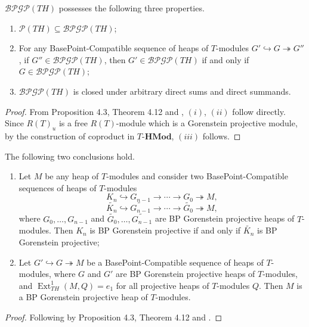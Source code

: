 \documentclass[11pt, twoside]{article}
\begin{document}
\begin{proposition}
$\mathcal{BPGP}(TH)$ possesses the following three properties.
\begin{enumerate}
    \item[(i)] $\mathcal{P}(TH) \subseteq \mathcal{BPGP}(TH)$;
    \item[(ii)] For any BasePoint-Compatible sequence of heaps of $T$-modules $G'\hookrightarrow G \twoheadrightarrow G''$, if $G''\in \mathcal{BPGP}(TH)$, then $G'\in \mathcal{BPGP}(TH)$ if and only if $G\in \mathcal{BPGP}(TH)$;
    \item[(iii)] $\mathcal{BPGP}(TH)$ is closed under arbitrary direct sums and direct summands.
\end{enumerate}
\end{proposition}
\begin{proof}
From Proposition 4.3, Theorem 4.12 and \cite[Theorem 2.5]{rb}, $(i)$, $(ii)$ follow directly. Since $R(T)_u$ is a free $R(T)$-module which is a Gorenstein projective module, by the construction of coproduct in $T\textbf{-HMod}$, $(iii)$ follows.
\end{proof}



\begin{proposition}
The following two conclusions hold.
\begin{enumerate}
    \item[(i)] Let $M$ be any heap of $T$-modules and consider two BasePoint-Compatible sequences of heaps of $T$-modules
    $$K_n\hookrightarrow G_{n-1}\rightarrow \cdots \rightarrow G_0 \twoheadrightarrow M,$$
    $$\tilde{K_n}\hookrightarrow \tilde{G_{n-1}}\rightarrow \cdots \rightarrow \tilde{G_0} \twoheadrightarrow M,$$
    where $G_0,\ldots,G_{n-1}$ and $\tilde{G_0},\ldots,\tilde{G_{n-1}}$ are BP Gorenstein projective heaps of $T$-modules. Then $K_n$ is BP Gorenstein projective if and only if $\tilde{K_n}$ is BP Gorenstein projective;
    \item[(ii)] Let $G' \hookrightarrow G \twoheadrightarrow M$ be a BasePoint-Compatible sequence of heaps of $T$-modules, where $G$ and $G'$ are BP Gorenstein projective heaps of $T$-modules, and $\operatorname{Ext}_{TH}^1(M,Q)=e_1$ for all projective heaps of $T$-modules $Q$. Then $M$ is a BP Gorenstein projective heap of $T$-modules.
\end{enumerate}
\end{proposition}
\begin{proof}
Following by Proposition 4.3, Theorem 4.12 and \cite[Proposition 2.7, Corollary 2.11]{rb}.
\end{proof}
\end{document}
